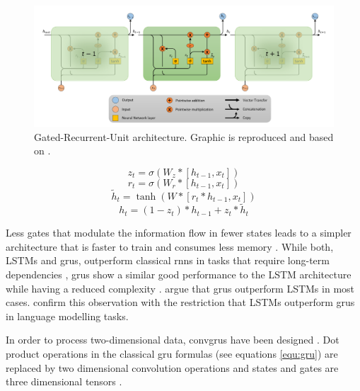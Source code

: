 \documentclass[11pt,
  paper=a4, 
  bibliography=totocnumbered,
	captions=tableheading,
	BCOR=10mm
]{scrreprt}
\theoremstyle{definition}
\def \figwidth {0.9\linewidth}
\begin{document}
\begin{figure}[H]
	\centering
	\includegraphics[width=\figwidth]{GRU-chain}
	\caption[Gated-Recurrent-Unit Architecture]{
		Gated-Recurrent-Unit architecture. Graphic is reproduced and based on \textcite{Olah2015}.
		\label{fig:GRU-chain}}
\end{figure}


\begin{equ}[!ht]
	\begin{equation}
		z_t = \sigma{(W_z * [h_{t-1},x_t])} %
	\end{equation}
	\begin{equation}
		r_t = \sigma{(W_r * [h_{t-1},x_t])}
	\end{equation}
	\begin{equation}
		\widetilde{h}_t = \tanh{(W * [r_t*h_{t-1},x_t])} 
	\end{equation}
	\begin{equation}
		h_t = (1-z_t)*h_{t-1}+z_t*\widetilde{h}_t
	\end{equation} 
\caption[GRU Gates]{Formulas to compute the different gates and states. Extracted from \textcite{Chung2014}}
\label{equ:gru}
\end{equ}

Less gates that modulate the information flow in fewer states \cite{Chung2014} leads to a simpler architecture that is faster to train \cite{Yurdakul2017} and consumes less memory \cite{Valipour2017}.
While both, LSTMs and \glspl{gru}, outperform classical \glspl{rnn} in tasks that require long-term dependencies \cite{Chung2014}, \glspl{gru} show a similar good performance to the LSTM architecture while having a reduced complexity \cite{Valipour2017}.
\textcite{Dey2017} argue that \glspl{gru} outperform LSTMs in most cases. 
\textcite{Jozefowicz2015} confirm this observation with the restriction that LSTMs outperform \glspl{gru} in language modelling tasks.

In order to process two-dimensional data, \glspl{convgru} have been designed \cite{Ballas2016,Siam2018}.
Dot product operations in the classical \gls{gru} formulas (see equations \ref{equ:gru}) are replaced by two dimensional convolution operations \cite{Siam2018} and states and gates are three dimensional tensors \cite{Tokmakov2017}.
\end{document}
